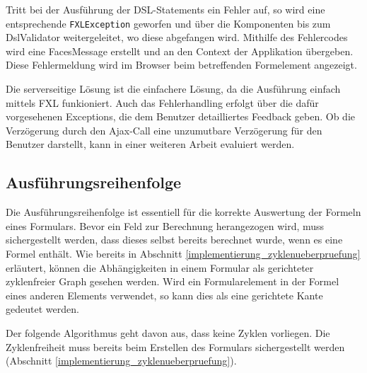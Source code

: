 Tritt bei der Aus\-führ\-ung der DSL-Statements ein Fehler auf, so wird eine ent\-sprech\-ende \texttt{FXLException} geworfen und über die Komponenten bis zum DslValidator weitergeleitet, wo diese abgefangen wird. Mithilfe des Fehlercodes wird eine FacesMessage erstellt und an den Context der Applikation übergeben. Diese Fehlermeldung wird im Browser beim betreffenden Formelement angezeigt.

Die serverseitige Lösung ist die einfachere Lösung, da die Aus\-führ\-ung einfach mittels FXL funkioniert. Auch das Fehlerhandling erfolgt über die dafür vorgesehenen Exceptions, die dem Benutzer detailliertes Feedback geben. Ob die Verzögerung durch den Ajax-Call eine unzumutbare Verzögerung für den Benutzer darstellt, kann in einer weiteren Arbeit evaluiert werden. 


\subsection{Aus\-führ\-ungsreihenfolge}
\label{implementierung_integration_reihenfolge}

Die Aus\-führ\-ungsreihenfolge ist essentiell für die korrekte Auswertung der Formeln eines Formulars. Bevor ein Feld zur Berechnung herangezogen wird, muss sichergestellt werden, dass dieses selbst bereits berechnet wurde, wenn es eine Formel enthält. Wie bereits in Abschnitt \ref{implementierung_zyklenueberpruefung} erläutert, können die Abhängigkeiten in einem Formular als gerichteter zyklenfreier Graph gesehen werden. Wird ein Formularelement in der Formel eines anderen Elements verwendet, so kann dies als eine gerichtete Kante gedeutet werden.

Der folgende Algorithmus geht davon aus, dass keine Zyklen vorliegen. Die Zyklenfreiheit muss bereits beim Erstellen des Formulars sichergestellt werden (Abschnitt \ref{implementierung_zyklenueberpruefung}).

